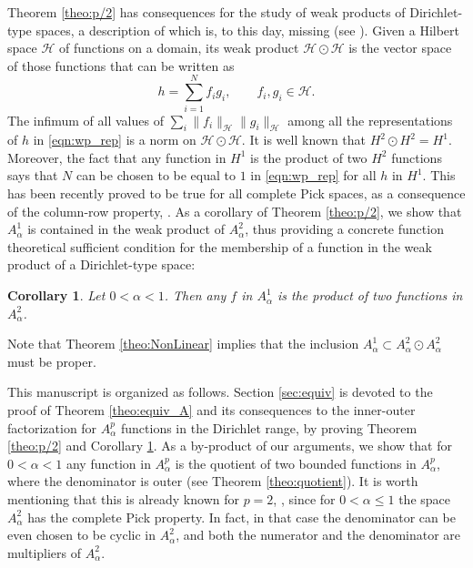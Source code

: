 \documentclass[12pt]{amsart}
\newtheorem{corollary}[theorem]{Corollary}
\theoremstyle{definition}
\newcommand{\rkhs}{\mathcal{H}}
\numberwithin{equation}{section}
\begin{document}
        Theorem \ref{theo:p/2} has consequences for the study of weak products of Dirichlet-type spaces, a description of which is, to this day, missing (see \cite[Question 4.7]{AHMR21}). Given a Hilbert space $\rkhs$ of functions on a domain, its weak product $\rkhs\odot\rkhs$ is the vector space of those functions that can be written as
            \begin{equation}
            \label{eqn:wp_rep}
                h=\sum_{i=1}^N f_ig_i, \qquad f_i, g_i\in\rkhs.
            \end{equation}
            The infimum of all values of $\sum_i\|f_i\|_\rkhs\|g_i\|_\rkhs$ among all the representations of $h$ in \eqref{eqn:wp_rep} is a norm on $\rkhs\odot\rkhs$. It is well known that $H^2\odot H^2=H^1$. Moreover, the fact that any function in $H^1$ is the product of two $H^2$ functions says that $N$ can be chosen to be equal to $1$ in \eqref{eqn:wp_rep} for all $h$ in $H^1$. This has been recently proved to be true for all complete Pick spaces, as a consequence of the column-row property, \cite[Theorem 1.4]{Hartz23}. As a corollary of Theorem \ref{theo:p/2}, we show that $A^1_\alpha$ is contained in the weak product of $A^2_\alpha$, thus providing a concrete function theoretical sufficient condition for the membership of a function in the weak product of a Dirichlet-type space:
            
        \begin{corollary}
        \label{coro:wp}
            Let $0<\alpha<1$. Then any $f$ in $A^1_\alpha$ is the product of two functions in $A^2_\alpha$. 
        \end{corollary}

        Note that Theorem \ref{theo:NonLinear} implies that the inclusion $A^1_\alpha\subset A^2_\alpha\odot A^2_\alpha$ must be proper.

        This manuscript is organized as follows. Section \ref{sec:equiv} is devoted to the proof of Theorem \ref{theo:equiv_A} and its consequences to the inner-outer factorization for $A^p_\alpha$ functions in the Dirichlet range, by proving Theorem \ref{theo:p/2} and Corollary \ref{coro:wp}. As a by-product of our arguments, we show that for $0<\alpha<1$ any function in $A^p_\alpha$ is the quotient of two bounded functions in $A^p_\alpha$, where the denominator is outer (see Theorem \ref{theo:quotient}). It is worth mentioning that this is already known for $p=2$, \cite{AHMR17}, since for $0<\alpha\le1$ the space $A^2_\alpha$ has the complete Pick property. In fact, in that case the denominator can be even chosen to be cyclic in $A^2_\alpha$, and both the numerator and the denominator are multipliers of $A^2_\alpha$.
        
\end{document}
